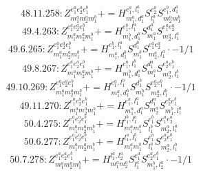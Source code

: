 \documentclass[letterpaper,10pt,fleqn,leqno,onecolumn]{article}
\begin{document}
\begin{equation} \;\;\;\;\;\;  48.11.258: Z^{e_{1}^{a}e_{2}^{a}e_{1}^{b}}_{m_{1}^{a}m_{2}^{a}m_{1}^{b}}+=H^{e_{1}^{a},l_{1}^{a}}_{m_{1}^{a},d_{1}^{a}}S^{e_{2}^{a}}_{l_{1}^{a}}S^{e_{1}^{b},d_{1}^{a}}_{m_{2}^{a}m_{1}^{b}} \end{equation}
\begin{equation} \;\;\;\;\;\;  49.4.263: Z^{e_{1}^{a}e_{2}^{a}e_{1}^{b}}_{m_{1}^{a}m_{2}^{a}m_{1}^{b}}+=H^{e_{1}^{b},l_{1}^{a}}_{m_{1}^{b},d_{1}^{a}}S^{d_{1}^{a}}_{m_{1}^{a}}S^{e_{1}^{a}e_{2}^{a}}_{m_{2}^{a},l_{1}^{a}} \end{equation}
\begin{equation} \;\;\;\;\;\;  49.6.265: Z^{e_{1}^{a}e_{2}^{a}e_{1}^{b}}_{m_{1}^{a}m_{2}^{a}m_{1}^{b}}+=H^{e_{1}^{b},l_{1}^{a}}_{m_{1}^{a},d_{1}^{b}}S^{d_{1}^{b}}_{m_{1}^{b}}S^{e_{1}^{a}e_{2}^{a}}_{m_{2}^{a},l_{1}^{a}}\cdot -1/1 \end{equation}
\begin{equation} \;\;\;\;\;\;  49.8.267: Z^{e_{1}^{a}e_{2}^{a}e_{1}^{b}}_{m_{1}^{a}m_{2}^{a}m_{1}^{b}}+=H^{e_{1}^{a},l_{1}^{b}}_{m_{1}^{b},d_{1}^{a}}S^{d_{1}^{a}}_{m_{1}^{a}}S^{e_{2}^{a}e_{1}^{b}}_{m_{2}^{a},l_{1}^{b}} \end{equation}
\begin{equation} \;\;\;\;\;\;  49.10.269: Z^{e_{1}^{a}e_{2}^{a}e_{1}^{b}}_{m_{1}^{a}m_{2}^{a}m_{1}^{b}}+=H^{e_{1}^{a},l_{1}^{b}}_{m_{1}^{a},d_{1}^{b}}S^{d_{1}^{b}}_{m_{1}^{b}}S^{e_{2}^{a}e_{1}^{b}}_{m_{2}^{a},l_{1}^{b}}\cdot -1/1 \end{equation}
\begin{equation} \;\;\;\;\;\;  49.11.270: Z^{e_{1}^{a}e_{2}^{a}e_{1}^{b}}_{m_{1}^{a}m_{2}^{a}m_{1}^{b}}+=H^{e_{1}^{a},l_{1}^{a}}_{m_{1}^{a},d_{1}^{a}}S^{d_{1}^{a}}_{m_{2}^{a}}S^{e_{2}^{a}e_{1}^{b}}_{m_{1}^{b},l_{1}^{a}} \end{equation}
\begin{equation} \;\;\;\;\;\;  50.4.275: Z^{e_{1}^{a}e_{2}^{a}e_{1}^{b}}_{m_{1}^{a}m_{2}^{a}m_{1}^{b}}+=H^{l_{1}^{b},l_{1}^{a}}_{m_{1}^{a}m_{1}^{b}}S^{e_{1}^{b}}_{l_{1}^{b}}S^{e_{1}^{a}e_{2}^{a}}_{m_{2}^{a},l_{1}^{a}} \end{equation}
\begin{equation} \;\;\;\;\;\;  50.6.277: Z^{e_{1}^{a}e_{2}^{a}e_{1}^{b}}_{m_{1}^{a}m_{2}^{a}m_{1}^{b}}+=H^{l_{1}^{a},l_{1}^{b}}_{m_{1}^{a}m_{1}^{b}}S^{e_{1}^{a}}_{l_{1}^{a}}S^{e_{2}^{a}e_{1}^{b}}_{m_{2}^{a},l_{1}^{b}} \end{equation}
\begin{equation} \;\;\;\;\;\;  50.7.278: Z^{e_{1}^{a}e_{2}^{a}e_{1}^{b}}_{m_{1}^{a}m_{2}^{a}m_{1}^{b}}+=H^{l_{1}^{a},l_{2}^{a}}_{m_{1}^{a}m_{2}^{a}}S^{e_{1}^{a}}_{l_{1}^{a}}S^{e_{2}^{a}e_{1}^{b}}_{m_{1}^{b},l_{2}^{a}}\cdot -1/1 \end{equation}
\end{document}
